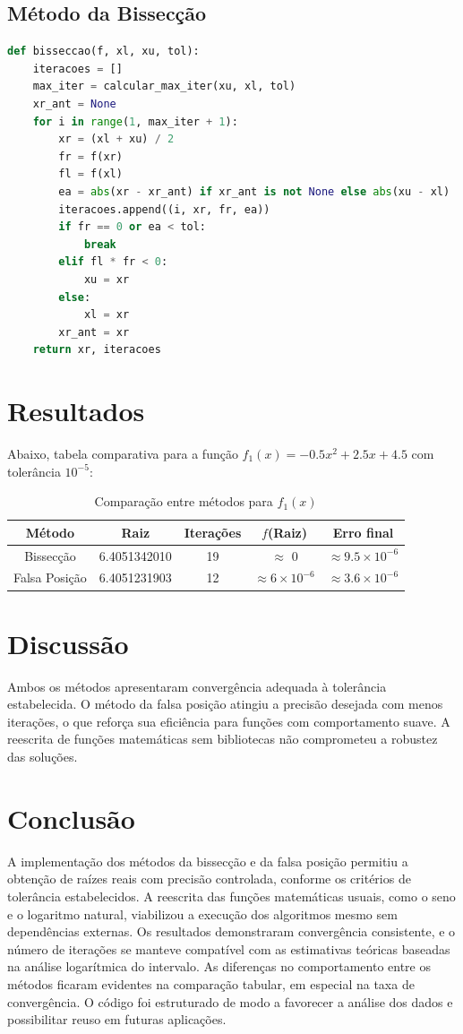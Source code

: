 \documentclass[12pt]{article}
\begin{document}
\newpage
\subsection*{Método da Bissecção}
\begin{lstlisting}[language=Python]
def bisseccao(f, xl, xu, tol):
    iteracoes = []
    max_iter = calcular_max_iter(xu, xl, tol)
    xr_ant = None
    for i in range(1, max_iter + 1):
        xr = (xl + xu) / 2
        fr = f(xr)
        fl = f(xl)
        ea = abs(xr - xr_ant) if xr_ant is not None else abs(xu - xl)
        iteracoes.append((i, xr, fr, ea))
        if fr == 0 or ea < tol:
            break
        elif fl * fr < 0:
            xu = xr
        else:
            xl = xr
        xr_ant = xr
    return xr, iteracoes
\end{lstlisting}

\section*{Resultados}
Abaixo, tabela comparativa para a função $f_1(x) = -0.5x^2 + 2.5x + 4.5$ com tolerância $10^{-5}$:

\begin{table}[H]
\centering
\begin{tabular}{|c|c|c|c|c|}
\hline
Método & Raiz & Iterações & $f$(Raiz) & Erro final \\
\hline
Bissecção & 6.4051342010 & 19 & $\approx$ 0 & $\approx 9.5 \times 10^{-6}$ \\
Falsa Posição & 6.4051231903 & 12 & $\approx 6 \times 10^{-6}$ & $\approx 3.6 \times 10^{-6}$ \\
\hline
\end{tabular}
\caption{Comparação entre métodos para $f_1(x)$}
\end{table}

\section*{Discussão}
Ambos os métodos apresentaram convergência adequada à tolerância estabelecida. O método da falsa posição atingiu a precisão desejada com menos iterações, o que reforça sua eficiência para funções com comportamento suave. A reescrita de funções matemáticas sem bibliotecas não comprometeu a robustez das soluções.

\section*{Conclusão}
A implementação dos métodos da bissecção e da falsa posição permitiu a obtenção de raízes reais com precisão controlada, conforme os critérios de tolerância estabelecidos. A reescrita das funções matemáticas usuais, como o seno e o logaritmo natural, viabilizou a execução dos algoritmos mesmo sem dependências externas. Os resultados demonstraram convergência consistente, e o número de iterações se manteve compatível com as estimativas teóricas baseadas na análise logarítmica do intervalo. As diferenças no comportamento entre os métodos ficaram evidentes na comparação tabular, em especial na taxa de convergência. O código foi estruturado de modo a favorecer a análise dos dados e possibilitar reuso em futuras aplicações.
\end{document}
